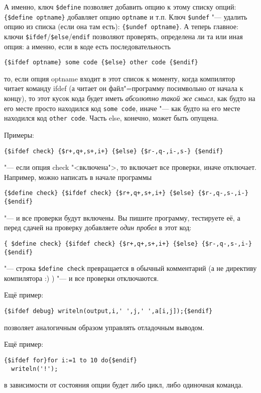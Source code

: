 А именно, ключ \verb|$define| позволяет добавить опцию к этому списку опций: 
\verb|{$define optname}| добавляет опцию \verb|optname| и т.п. Ключ \verb|$undef| "--- удалить 
опцию из списка (если она там есть): \verb|{$undef optname}|. А теперь главное: ключи 
\verb|$ifdef|/\verb|$else|/\verb|endif| позволяют проверять, определена ли та или иная опция: а 
именно, если в коде есть последовательность 

\begin{center}
\verb|{$ifdef optname} some code {$else} other code {$endif}|
\end{center}
то, если опция optname входит в этот список к моменту, когда компилятор читает команду ifdef (а 
читает он файл"=программу посимвольно от начала к концу),  то этот кусок кода будет иметь 
\textit{абсолютно такой же смысл}, как будто на его месте просто находился код \verb|some code|,
иначе "--- как будто на его месте находился код \verb|other code|. Часть else, конечно, может быть 
опущена.

Примеры:

\begin{center}
\verb|{$ifdef check} {$r+,q+,s+,i+} {$else} {$r-,q-,i-,s-} {$endif}|
\end{center}
 "--- если опция check "<включена">, то включает все проверки, иначе отключает. Например, можно 
написать в начале программы

\begin{center}
\verb|{$define check} {$ifdef check} {$r+,q+,s+,i+} {$else} {$r-,q-,s-,i-} {$endif}|
\end{center}
 "--- и все проверки будут включены. Вы пишите программу, тестируете её, а перед сдачей на проверку 
добавляете \textit{один пробел} в этот код:

\begin{center}
\verb|{ $define check} {$ifdef check} {$r+,q+,s+,i+} {$else} {$r-,q-,s-,i-} {$endif}|
\end{center}
 "--- строка \verb|$define check| превращается в обычный комментарий (а не директиву компилятора :) 
) "--- и все проверки отключаются.

Ещё пример:

\begin{center}
\verb|{$ifdef debug} writeln(output,i,' ',j,' ',a[i,j]);{$endif}|
\end{center}
позволяет аналогичным образом управлять отладочным выводом. 

Ещё пример:

\begin{center}
\begin{verbatim}
{$ifdef for}for i:=1 to 10 do{$endif}
  writeln('!');
\end{verbatim}
\end{center}
в зависимости от состояния опции будет либо цикл, либо одиночная команда.

